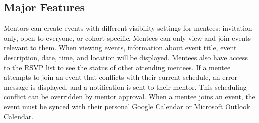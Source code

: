 \subsection{Major Features}
\label{subsection:major-features}

Mentors can create events with different visibility settings for mentees:
invitation-only, open to everyone, or cohort-specific. Mentees can only view and
join events relevant to them. When viewing events, information about event
title, event description, date, time, and location will be displayed. Mentees
also have access to the RSVP list to see the status of other attending mentees.
If a mentee attempts to join an event that conflicts with their current
schedule, an error message is displayed, and a notification is sent to their
mentor. This scheduling conflict can be overridden by mentor approval. When a
mentee joins an event, the event must be synced with their personal Google
Calendar or Microsoft Outlook Calendar.
